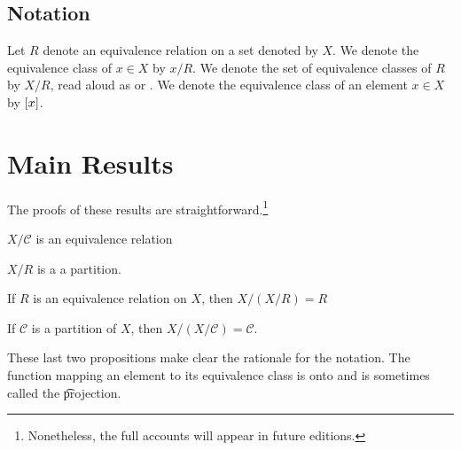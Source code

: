 \subsection*{Notation}

Let $R$ denote an equivalence relation on a set denoted by $X$.
We denote the equivalence class of $x \in X$ by $x / R$.
We denote the set of equivalence classes of $R$ by $X/R$, read aloud as  or .
We denote the equivalence class of an element $x \in X$ by $[x]$.

\section*{Main Results}

The proofs of these results are straightforward.\footnote{Nonetheless, the full accounts will appear in future editions.}

\begin{proposition}
$X/\mathcal{C} $ is an equivalence relation\end{proposition}
\begin{proposition}
$X/R$ is a a partition.\end{proposition}
\begin{proposition}
If $R$ is an equivalence relation on $X$, then $X/(X/R) = R$\end{proposition}
\begin{proposition}
If $\mathcal{C} $ is a partition of $X$, then $X/(X/\mathcal{C} ) = \mathcal{C} $.\end{proposition}
These last two propositions make clear the rationale for the notation.
The function mapping an element to its equivalence class is onto and is sometimes called the \t{projection}.
%  

